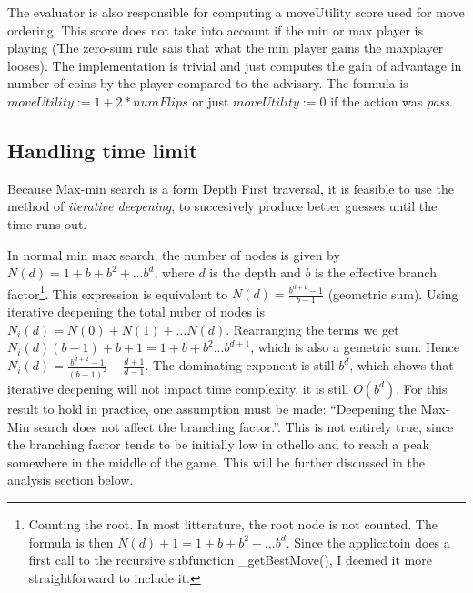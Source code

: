 \documentclass[a4paper,11pt]{article}
\begin{document}
The evaluator is also responsible for computing a moveUtility score used for move ordering. This score does not take into account if the min or max player is playing (The zero-sum rule sais that what the min player gains the maxplayer looses). The implementation is trivial and just computes the gain of advantage in number of coins by the player compared to the advisary. The formula is $moveUtility := 1 + 2*numFlips$ or just $moveUtility := 0$ if the action was \textit{pass}.

%
%	
%
%		
%	
%
%	
%	
%	

\subsection{Handling time limit}
Because Max-min search is a form Depth First traversal, it is feasible to use the method of \textit{iterative deepening}, to succesively produce better guesses until the time runs out.

In normal min max search, the number of nodes is given by $N(d) = 1 + b + b^2 + ... b^d$, where $d$ is the depth and $b$ is the effective branch factor\footnote{Counting the root. In most litterature, the root node is not counted. The formula is then $N(d) +1 = 1 + b + b^2 + ... b^d$. Since the applicatoin does a first call to the recursive subfunction \_getBestMove(), I deemed it more straightforward to include it.}. This expression is equivalent to $N(d) = \frac{b^{d+1} -1}{b -1}$ (geometric sum). Using iterative deepening the total nuber of nodes is $N_i(d) = N(0) + N(1) + ... N(d)$. Rearranging the terms we get $N_i(d)(b-1) + b + 1= 1 + b + b^2 ... b^{d+1}$, which is also a gemetric sum. Hence $N_i(d) = \frac{b^{d+2} - 1}{(b - 1)^2} - \frac{d+1}{d-1}$. The dominating exponent is still $b^d$, which shows that iterative deepening will not impact time complexity, it is still $O(b^d)$. For this result to hold in practice, one assumption must be made: ``Deepening the Max-Min search does not affect the branching factor.''. This is not entirely true, since the branching factor tends to be initially low in othello and to reach a peak somewhere in the middle of the game. This will be further discussed in the analysis section below.
\end{document}
